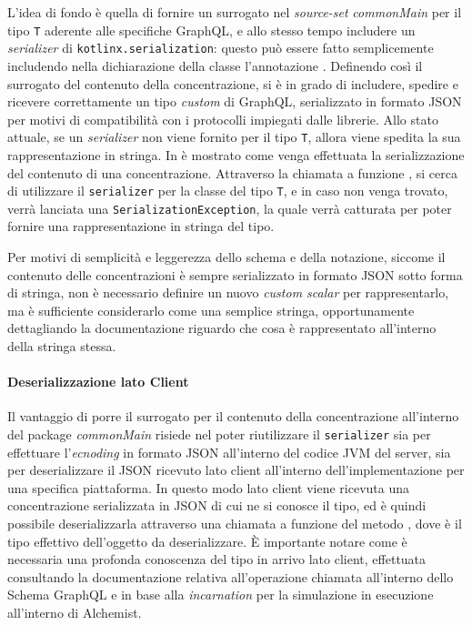 L'idea di fondo è quella di fornire un surrogato nel \textit{source-set} \textit{commonMain} per il tipo \texttt{T} aderente alle specifiche GraphQL, e allo
stesso tempo includere un \textit{serializer} di \texttt{kotlinx.serialization}: questo può essere fatto semplicemente includendo nella
dichiarazione della classe l'annotazione . Definendo così il surrogato del contenuto della concentrazione, si è in grado di
includere, spedire e ricevere correttamente un tipo \textit{custom} di GraphQL, serializzato in formato JSON per motivi di compatibilità con i protocolli
impiegati dalle librerie. Allo stato attuale, se un \textit{serializer} non viene fornito per il tipo \texttt{T}, allora viene spedita la sua rappresentazione
in stringa. In  è mostrato come venga effettuata la serializzazione del contenuto di una concentrazione.
%
%
Attraverso la chiamata a funzione , si cerca di utilizzare il \texttt{serializer} per la classe del tipo \texttt{T},
e in caso non venga trovato, verrà lanciata una \texttt{SerializationException}, la quale verrà catturata per poter fornire una rappresentazione in stringa
del tipo.

Per motivi di semplicità e leggerezza dello schema e della notazione, siccome il contenuto delle concentrazioni è sempre serializzato in formato JSON sotto forma di stringa,
non è necessario definire un nuovo \textit{custom scalar} per rappresentarlo, ma è sufficiente considerarlo come una semplice stringa, opportunamente dettagliando la
documentazione riguardo che cosa è rappresentato all'interno della stringa stessa.

\paragraph{Deserializzazione lato Client}
Il vantaggio di porre il surrogato per il contenuto della concentrazione all'interno del package \textit{commonMain} risiede nel poter riutilizzare il \texttt{serializer}
sia per effettuare l'\textit{ecnoding} in formato JSON all'interno del codice \ac{JVM} del server, sia per deserializzare il JSON ricevuto lato client all'interno
dell'implementazione per una specifica piattaforma. In questo modo lato client viene ricevuta una concentrazione serializzata in JSON di cui ne si conosce il tipo,
ed è quindi possibile deserializzarla attraverso una chiamata a funzione del metodo , dove  è il tipo
effettivo dell'oggetto da deserializzare. È importante notare come è necessaria una profonda conoscenza del tipo in arrivo lato client, effettuata consultando
la documentazione relativa all'operazione chiamata all'interno dello Schema GraphQL e in base alla \textit{incarnation} per la simulazione in esecuzione all'interno di Alchemist.


